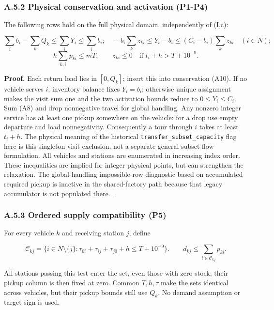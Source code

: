 \documentclass[
  american,
  11pt,
]{article}
\begin{document}
\subsubsection{A.5.2 Physical conservation and activation
(P1-P4)}\label{a.5.2-physical-conservation-and-activation-p1-p4}

The following rows hold on the full physical domain, independently of
(I,c):

\[
\sum_i b_i-\sum_kQ_k\le\sum_iY_i\le\sum_i b_i;
\quad -b_i\sum_kz_{ki}\le Y_i-b_i\le(C_i-b_i)\sum_kz_{ki}\quad(i\in N);
\tag{A22}
\] \[
h\sum_{k,i}p_{ki}\le mT;
\qquad z_{ki}\le0\quad\text{if }t_i+h>T+10^{-9}.
\tag{A23}
\]

\textbf{Proof.} Each return load lies in \([0,Q_k]\); insert this into
conservation (A10). If no vehicle serves \(i\), inventory balance fixes
\(Y_i=b_i\); otherwise unique assignment makes the visit sum one and the
two activation bounds reduce to \(0\le Y_i\le C_i\). Sum (A8) and drop
nonnegative travel for global handling. Any nonzero integer service has
at least one pickup somewhere on the vehicle: for a drop use empty
departure and load nonnegativity. Consequently a tour through \(i\)
takes at least \(t_i+h\). The physical meaning of the historical
\texttt{transfer\_\allowbreak{}subset\_\allowbreak{}capacity} flag here is this
singleton visit exclusion, not a separate general subset-flow
formulation. All vehicles and stations are enumerated in increasing
index order. These inequalities are implied for integer physical points,
but can strengthen the relaxation. The global-handling impossible-row
diagnostic based on accumulated required pickup is inactive in the
shared-factory path because that legacy accumulator is not populated
there. \(\square\)

\subsubsection{A.5.3 Ordered supply compatibility
(P5)}\label{a.5.3-ordered-supply-compatibility-p5}

For every vehicle \(k\) and receiving station \(j\), define

\[
\mathcal C_{kj}=\{i\in N\setminus\{j\}:\tau_{0i}+\tau_{ij}+\tau_{j0}+h\le T+10^{-9}\}.
\qquad d_{kj}\le\sum_{i\in\mathcal C_{kj}}p_{ki}.
\tag{A24}
\]

All stations passing this test enter the set, even those with zero
stock; their pickup column is then fixed at zero. Common \(T,h,\tau\)
make the sets identical across vehicles, but their pickup bounds still
use \(Q_k\). No demand assumption or target sign is used.
\end{document}
